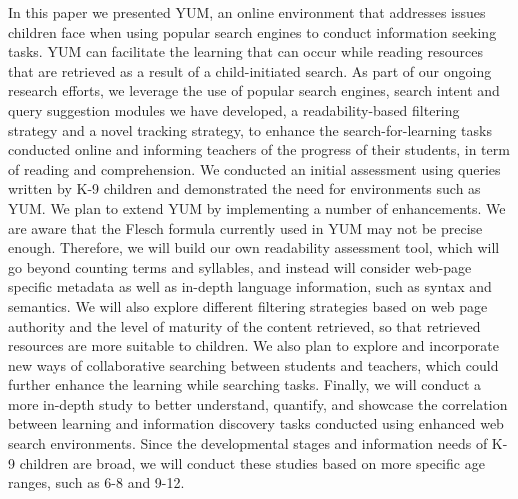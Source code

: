 \documentclass{sig-alternate-05-2015}
\begin{document}
In this paper we presented YUM, an online environment that addresses issues children face when using popular search engines to conduct information seeking tasks. YUM can facilitate the learning that can occur while reading resources that are retrieved as a result of a child-initiated search. As part of our ongoing research efforts, we leverage the use of popular search engines, search intent and query suggestion modules we have developed, a readability-based filtering strategy and a novel tracking strategy, to enhance the search-for-learning tasks conducted online and informing teachers of the progress of their students, in term of reading and comprehension. We conducted an initial assessment using queries written by K-9 children and demonstrated the need for environments such as YUM. 
We plan to extend YUM by implementing a number of enhancements. We are aware that the Flesch formula currently used in YUM may not be precise enough. Therefore, we will build our own readability assessment tool, which will go beyond counting terms and syllables, and instead will consider web-page specific metadata as well as in-depth language information, such as syntax and semantics.  We will also explore different filtering strategies based on web page authority and the level of maturity of the content retrieved, so that retrieved resources are more suitable to children. We also plan to explore and incorporate new ways of collaborative searching between students and teachers, which could further enhance the learning while searching tasks.  Finally, we will conduct a more in-depth study to better understand, quantify, and showcase the correlation between learning and information discovery tasks conducted using enhanced web search environments.  Since the developmental stages and information needs of K-9 children are broad, we will conduct these studies based on more specific age ranges, such as 6-8 and 9-12. 

%


%
%
\end{document}
